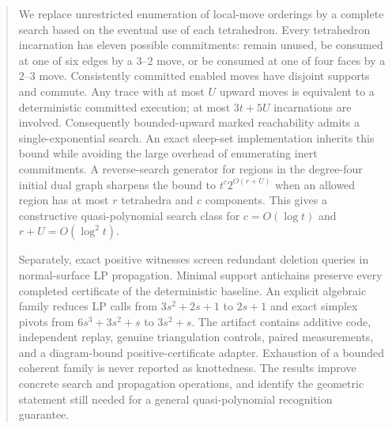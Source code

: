 \documentclass[11pt]{article}
\theoremstyle{definition}
\theoremstyle{remark}
\begin{document}
\begin{abstract}
We replace unrestricted enumeration of local-move orderings by a complete
search based on the eventual use of each tetrahedron. Every tetrahedron incarnation
has eleven possible commitments: remain unused, be consumed at one of six edges
by a $3$--$2$ move, or be consumed at one of four faces by a $2$--$3$ move.
Consistently committed enabled moves have disjoint supports and commute. Any trace
with at most $U$ upward moves is equivalent to a deterministic committed execution;
at most $3t+5U$ incarnations are involved. Consequently bounded-upward marked
reachability admits a single-exponential search. An exact sleep-set implementation
inherits this bound while avoiding the large overhead of enumerating inert
commitments. A reverse-search generator for regions in the degree-four initial
dual graph sharpens the bound to $t^c2^{O(r+U)}$ when an allowed region has at most
$r$ tetrahedra and $c$ components. This gives a constructive quasi-polynomial
search class for $c=O(\log t)$ and $r+U=O(\log^2 t)$.

Separately, exact positive witnesses screen redundant deletion queries in
normal-surface LP propagation. Minimal support antichains preserve every completed
certificate of the deterministic baseline. An explicit algebraic family reduces
LP calls from $3s^2+2s+1$ to $2s+1$ and exact simplex pivots from
$6s^3+3s^2+s$ to $3s^2+s$. The artifact contains additive code, independent
replay, genuine triangulation controls, paired measurements, and a diagram-bound
positive-certificate adapter. Exhaustion of a bounded coherent family is never
reported as knottedness. The results improve concrete search and propagation
operations, and identify the geometric statement still needed for a general
quasi-polynomial recognition guarantee.
\end{abstract}

\begingroup
\small
\setlength{\parskip}{0pt}
\tableofcontents
\endgroup
\clearpage
{}










\appendix


\clearpage
\begingroup\small\raggedright
\setlength{\parskip}{0pt}


\endgroup
\end{document}
